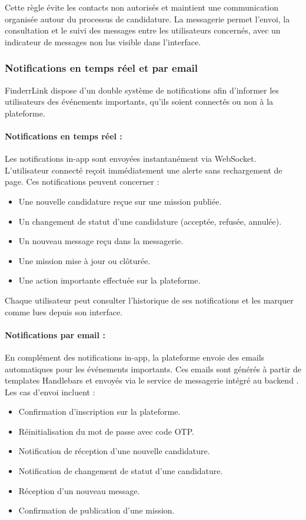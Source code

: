 Cette règle évite les contacts non autorisés et maintient une communication organisée autour du processus de candidature. La messagerie permet l'envoi, la consultation et le suivi des messages entre les utilisateurs concernés, avec un indicateur de messages non lus visible dans l'interface.

\subsubsection{Notifications en temps réel et par email}

FinderrLink dispose d'un double système de notifications afin d'informer les utilisateurs des événements importants, qu'ils soient connectés ou non à la plateforme.

\paragraph{Notifications en temps réel :}
Les notifications in-app sont envoyées instantanément via WebSocket. L'utilisateur connecté reçoit immédiatement une alerte sans rechargement de page. Ces notifications peuvent concerner :
\begin{itemize}
    \item Une nouvelle candidature reçue sur une mission publiée.
    \item Un changement de statut d'une candidature (acceptée, refusée, annulée).
    \item Un nouveau message reçu dans la messagerie.
    \item Une mission mise à jour ou clôturée.
    \item Une action importante effectuée sur la plateforme.
\end{itemize}
Chaque utilisateur peut consulter l'historique de ses notifications et les marquer comme lues depuis son interface.

\paragraph{Notifications par email :}
En complément des notifications in-app, la plateforme envoie des emails automatiques pour les événements importants. Ces emails sont générés à partir de templates Handlebars \cite{handlebars} et envoyés via le service de messagerie intégré au backend \cite{nodemailer}. Les cas d'envoi incluent :
\begin{itemize}
    \item Confirmation d'inscription sur la plateforme.
    \item Réinitialisation du mot de passe avec code OTP.
    \item Notification de réception d'une nouvelle candidature.
    \item Notification de changement de statut d'une candidature.
    \item Réception d'un nouveau message.
    \item Confirmation de publication d'une mission.
\end{itemize}

